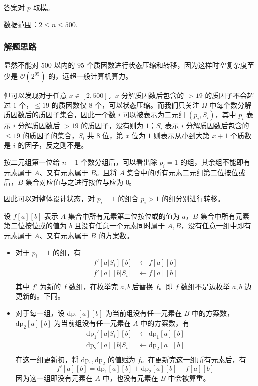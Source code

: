 答案对 \(p\) 取模。

数据范围：\(2\le n\le 500\).

\subsubsection{解题思路}

显然不能对 \(500\) 以内的 \(95\)
个质因数进行状态压缩和转移，因为这样时空复杂度至少是
\(\mathcal{O}(2^{95})\) 的，远超一般计算机算力。

但可以发现对于任意 \(x\in[2,500]\)，\(x\) 分解质因数后包含的 \(\gt19\)
的质因子不会超过 \(1\) 个，\(\le19\) 的质因数仅 \(8\)
个，可以状态压缩。而我们只关注 \(\Omega\)
中每个数分解质因数后的质因子集合，因此一个数 \(i\) 可以被表示为二元组
\((p_i,S_i)\)，其中 \(p_i\) 表示 \(i\) 分解质因数后 \(\gt19\)
的质因子，没有则为 \(1\)；\(S_i\) 表示 \(i\) 分解质因数后包含的
\(\le19\) 的质因子的集合，\(S_i\) 共 \(8\) 位，第 \(x\) 位为 \(1\)
则表示从小到大第 \(x+1\) 个质数是 \(i\) 的因子，反之则不是。

按二元组第一位给 \(n-1\) 个数分组后，可以看出除 \(p_i=1\)
的组，其余组不能即有元素属于 \(A\)、又有元素属于 \(B\)。且将 \(A\)
集合中的所有元素二元组第二位按位或后，\(B\) 集合对应值与之进行按位与应为
\(0\)。

因此可以对整体设计状态，对 \(p_i=1\) 的组合 \(p_i\gt1\)
的组分别进行转移。

设 \(f[a][b]\) 表示 \(A\) 集合中所有元素第二位按位或的值为 \(a\)，\(B\)
集合中所有元素第二位按位或的值为 \(b\) 且没有任意一个元素同时属于
\(A,B\)，没有任意一组中即有元素属于 \(A\)、又有元素属于 \(B\) 的方案数。

\begin{itemize}
\item
  对于 \(p_i=1\) 的组，有 \[
  \begin{aligned}
  f'[a|S_i][b]&\leftarrow f[a][b]\\
  f'[a][b|S_i]&\leftarrow f[a][b]\\
  \end{aligned}
  \] 其中 \(f'\) 为新的 \(f\) 数组，在枚举完 \(a,b\) 后替换 \(f\)。即
  \(f\) 数组不是边枚举 \(a,b\) 边更新的。下同。
\item
  对于每一组，设 \(\operatorname{dp_1}[a][b]\) 为当前组没有任一元素在
  \(B\) 中的方案数， \(\operatorname{dp_2}[a][b]\)
  为当前组没有任一元素在 \(A\) 中的方案数，有 \[
  \begin{aligned}
  \operatorname{dp_1}'[a|S_i][b]&\leftarrow \operatorname{dp_1}[a][b]\\
  \operatorname{dp_2}'[a][b|S_i]&\leftarrow \operatorname{dp_2}[a][b]\\
  \end{aligned}
  \] 在这一组更新初，将 \(\operatorname{dp_1},\operatorname{dp_2}\)
  的值赋为 \(f\)。在更新完这一组所有元素后，有 \[
  f'[a][b]=\operatorname{dp_1}[a][b]+\operatorname{dp_2}[a][b]-f[a][b]
  \] 因为这一组即没有元素在 \(A\) 中，也没有元素在 \(B\) 中会被算重。
\end{itemize}


